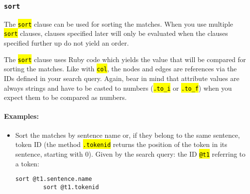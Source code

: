 \documentclass[12pt]{scrartcl}
\newcommand{\code}[1]{\hl{\texttt{#1}}}
\begin{document}
\subsubsection{\texttt{sort}}

The \code{sort} clause can be used for sorting the matches.
When you use multiple \code{sort} clauses, clauses specified later will only be evaluated when the clauses specified further up do not yield an order.

The \code{sort} clause uses Ruby code which yields the value that will be compared for sorting the matches.
Like with \code{col}, the nodes and edges are references via the IDs defined in your search query.
Again, bear in mind that attribute values are always strings and have to be casted to numbers (\code{.to\_i} or \code{.to\_f}) when you expect them to be compared as numbers.

\paragraph*{Examples:}
\begin{itemize}
	\item Sort the matches by sentence name or, if they belong to the same sentence, token ID (the method \code{.tokenid} returns the position of the token in its sentence, starting with 0). Given by the search query: the ID \code{@t1} referring to a token:
	\begin{lstlisting}[gobble=8,aboveskip=.6em,belowskip=.2em]
		sort @t1.sentence.name
		sort @t1.tokenid
	\end{lstlisting}
\end{itemize}
\end{document}
